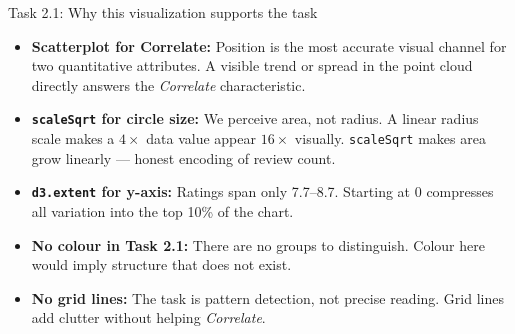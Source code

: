 \documentclass[aspectratio=169, 11pt]{beamer}
\begin{document}
\begin{frame}[t]{Task 2.1: Why this visualization supports the task}

\begin{itemize}\setlength\itemsep{8pt}
  \item \textbf{Scatterplot for Correlate:} Position is the most accurate visual channel for two quantitative attributes. A visible trend or spread in the point cloud directly answers the \textit{Correlate} characteristic.

  \item \textbf{\texttt{scaleSqrt} for circle size:} We perceive area, not radius. A linear radius scale makes a $4\times$ data value appear $16\times$ visually. \texttt{scaleSqrt} makes area grow linearly — honest encoding of review count.

  \item \textbf{\texttt{d3.extent} for y-axis:} Ratings span only 7.7–8.7. Starting at 0 compresses all variation into the top 10\% of the chart.

  \item \textbf{No colour in Task 2.1:} There are no groups to distinguish. Colour here would imply structure that does not exist.

  \item \textbf{No grid lines:} The task is pattern detection, not precise reading. Grid lines add clutter without helping \textit{Correlate}.
\end{itemize}

\end{frame}
\end{document}
